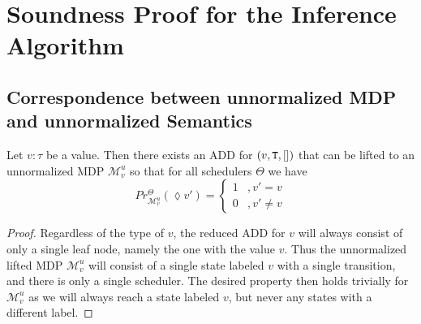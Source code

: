 
\section{Soundness Proof for the Inference Algorithm}

\subsection{Correspondence between unnormalized MDP and unnormalized Semantics}

\begin{lemma}\label{ValueCorrectnessLemma}
	Let $v \colon \tau$ be a value. Then there exists an ADD for $(v, \texttt{T}, [])$ that can be lifted to an unnormalized MDP $\mathcal{M}^u_v$ so that for all schedulers $\Theta$ we have 
	$$Pr^\Theta_{\mathcal{M}^u_v}(\lozenge v') = \begin{cases}
		1 &, v' = v\\
		0 &, v' \neq v
	\end{cases}$$
\end{lemma}
\begin{proof}
	Regardless of the type of $v$, the reduced ADD for $v$ will always consist of only a single leaf node, namely the one with the value $v$. 
	Thus the unnormalized lifted MDP $\mathcal{M}^u_v$ will consist of a single state labeled $v$ with a single transition, and there is only a single scheduler.
	The desired property then holds trivially for $\mathcal{M}^u_v$ as we will always reach a state labeled $v$, but never any states with a different label.
\end{proof}

